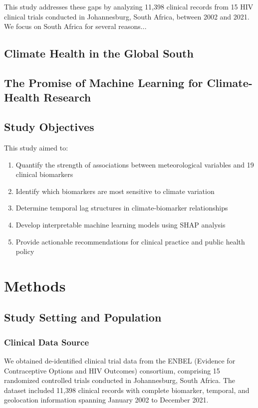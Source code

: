 \documentclass[11pt,a4paper]{article}
\begin{document}
This study addresses these gaps by analyzing 11,398 clinical records from 15 HIV clinical trials conducted in Johannesburg, South Africa, between 2002 and 2021. We focus on South Africa for several reasons...

\subsection{Climate Health in the Global South}

\subsection{The Promise of Machine Learning for Climate-Health Research}

\subsection{Study Objectives}
This study aimed to:
\begin{enumerate}
    \item Quantify the strength of associations between meteorological variables and 19 clinical biomarkers
    \item Identify which biomarkers are most sensitive to climate variation
    \item Determine temporal lag structures in climate-biomarker relationships
    \item Develop interpretable machine learning models using SHAP analysis
    \item Provide actionable recommendations for clinical practice and public health policy
\end{enumerate}

\section{Methods}

\subsection{Study Setting and Population}

\subsubsection{Clinical Data Source}
We obtained de-identified clinical trial data from the ENBEL (Evidence for Contraceptive Options and HIV Outcomes) consortium, comprising 15 randomized controlled trials conducted in Johannesburg, South Africa. The dataset included 11,398 clinical records with complete biomarker, temporal, and geolocation information spanning January 2002 to December 2021.
\end{document}
